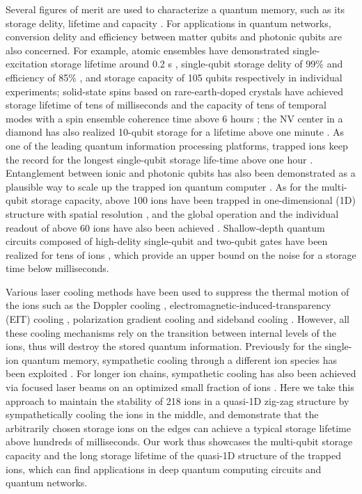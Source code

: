 Several figures of merit are used to characterize a quantum memory, such as its storage delity, lifetime and capacity \cite{lvovsky2009optical}. For applications in quantum networks, conversion delity and efficiency between matter qubits and photonic qubits are also concerned. For example, atomic ensembles have demonstrated single-excitation storage lifetime around 0.2 s \cite{yang2016efficient}, single-qubit storage delity of 99\% and efficiency of 85\% \cite{wang2019efficient}, and storage capacity of 105 qubits respectively in individual experiments; solid-state spins based on rare-earth-doped crystals have achieved storage lifetime of tens of milliseconds \cite{ortu2022storage} and the capacity of tens of temporal modes \cite{lago2021telecom} with a spin ensemble coherence time above 6 hours \cite{zhong2015optically}; the NV center in a diamond has also realized 10-qubit storage for a lifetime above one minute \cite{bradley2019ten}. As one of the leading quantum information processing platforms, trapped ions keep the record for the longest single-qubit storage life-time above one hour \cite{wang2021single}. Entanglement between ionic and photonic qubits has also been demonstrated \cite{blinov2004observation,stute2012tunable,hucul2015modular,bock2018high,krutyanskiy2019light} as a plausible way to scale up the trapped ion quantum computer \cite{duan2010colloquium,hucul2015modular}. As for the multi-qubit storage capacity, above 100 ions have been trapped in one-dimensional (1D) structure with spatial resolution \cite{pagano2018cryogenic}, and the global operation and the individual readout of above 60 ions have also been achieved \cite{li2023probing}. Shallow-depth quantum circuits composed of high-delity single-qubit and two-qubit gates have been realized for tens of ions \cite{egan2021fault,postler2022demonstration}, which provide an upper bound on the noise for a storage time below milliseconds.

Various laser cooling methods have been used to suppress the thermal motion of the ions such as the Doppler cooling \cite{leibfried2003quantum}, electromagnetic-induced-transparency (EIT) cooling \cite{qiao2021double, feng2020efficient}, polarization gradient cooling \cite{joshi2020polarization} and sideband cooling \cite{leibfried2003quantum}. However, all these cooling mechanisms rely on the transition between internal levels of the ions, thus will destroy the stored quantum information. Previously for the single-ion quantum memory, sympathetic cooling through a different ion species has been exploited \cite{wang2021single,chen2017sympathetic, blinov2002sympathetic, barrett2003sympathetic}. For longer ion chains, sympathetic cooling has also been achieved via focused laser beams on an optimized small fraction of ions \cite{mao2021experimental}. Here we take this approach to maintain the stability of 218 ions in a quasi-1D zig-zag structure by sympathetically cooling the ions in the middle, and demonstrate that the arbitrarily chosen storage ions on the edges can achieve a typical storage lifetime above hundreds of milliseconds. Our work thus showcases the multi-qubit storage capacity and the long storage lifetime of the quasi-1D structure of the trapped ions, which can find applications in deep quantum computing circuits and quantum networks.
